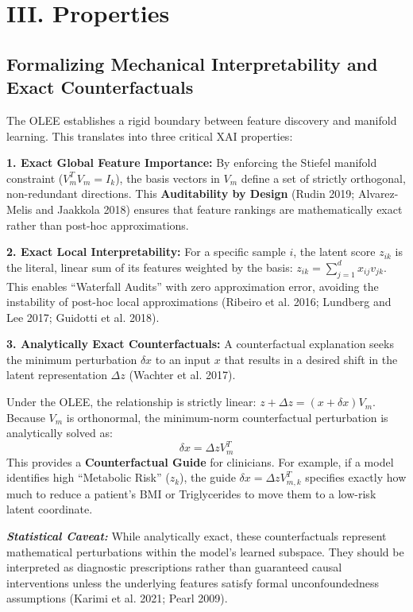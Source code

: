 \documentclass[
  letterpaper,
]{report}
\begin{document}
\section{III. Properties}\label{iii.-properties}

\subsection{Formalizing Mechanical Interpretability and Exact
Counterfactuals}\label{formalizing-mechanical-interpretability-and-exact-counterfactuals}

The OLEE establishes a rigid boundary between feature discovery and
manifold learning. This translates into three critical XAI properties:

\textbf{1. Exact Global Feature Importance:} By enforcing the Stiefel
manifold constraint (\(V_m^T V_m = I_k\)), the basis vectors in \(V_m\)
define a set of strictly orthogonal, non-redundant directions. This
\textbf{Auditability by Design} (Rudin 2019; Alvarez-Melis and Jaakkola
2018) ensures that feature rankings are mathematically exact rather than
post-hoc approximations.

\textbf{2. Exact Local Interpretability:} For a specific sample \(i\),
the latent score \(z_{ik}\) is the literal, linear sum of its features
weighted by the basis: \(z_{ik} = \sum_{j=1}^d x_{ij} v_{jk}\). This
enables ``Waterfall Audits'' with zero approximation error, avoiding the
instability of post-hoc local approximations (Ribeiro et al. 2016;
Lundberg and Lee 2017; Guidotti et al. 2018).

\textbf{3. Analytically Exact Counterfactuals:} A counterfactual
explanation seeks the minimum perturbation \(\delta x\) to an input
\(x\) that results in a desired shift in the latent representation
\(\Delta z\) (Wachter et al. 2017).

Under the OLEE, the relationship is strictly linear:
\(z + \Delta z = (x + \delta x) V_m\). Because \(V_m\) is orthonormal,
the minimum-norm counterfactual perturbation is analytically solved as:
\[ \delta x = \Delta z V_m^T \] This provides a \textbf{Counterfactual
Guide} for clinicians. For example, if a model identifies high
``Metabolic Risk'' (\(z_k\)), the guide
\(\delta x = \Delta z V_{m,k}^T\) specifies exactly how much to reduce a
patient's BMI or Triglycerides to move them to a low-risk latent
coordinate.

\textbf{\emph{Statistical Caveat:}} While analytically exact, these
counterfactuals represent mathematical perturbations within the model's
learned subspace. They should be interpreted as diagnostic prescriptions
rather than guaranteed causal interventions unless the underlying
features satisfy formal unconfoundedness assumptions (Karimi et al.
2021; Pearl 2009).
\end{document}
